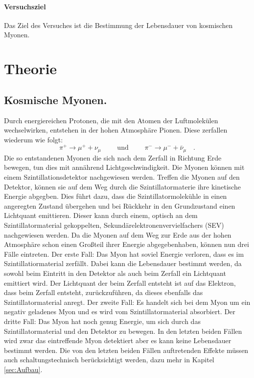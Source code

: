 \paragraph{Versuchsziel}
Das Ziel des Versuches ist die Bestimmung der Lebensdauer von kosmischen Myonen.

\section{Theorie}
\label{sec:Theorie}

\subsection{Kosmische Myonen.}
Durch energiereichen Protonen, die mit den Atomen der Luftmolekülen wechselwirken, entstehen in der hohen 
Atmosphäre Pionen. Diese zerfallen wiederum wie folgt:
\begin{equation*} 
\pi^+ \to \mu^+ + \nu_{\mu} \qquad \text{ und } \qquad \pi^- \to \mu^- + \bar{\nu}_{\mu} \quad .
\end{equation*}
Die so entstandenen Myonen die sich nach dem Zerfall in Richtung Erde bewegen, tun dies mit annährend 
Lichtgeschwindigkeit. Die Myonen können mit einem Szintillationsdetektor nachgewiesen werden. 
Treffen die Myonen auf den Detektor, können sie auf dem  Weg durch die Szintillatormaterie ihre kinetische 
Energie abgegben. Dies führt dazu, dass die Szintillatormolekühle in einen angeregten Zustand übergehen und bei 
Rückkehr in den Grundzustand einen Lichtquant emittieren. Dieser kann durch einem, optisch an dem 
Szintillatormaterial gekoppelten, Sekundärelektronenvervielfachers (SEV) nachgewiesen werden. Da die Myonen auf dem
Weg zur Erde aus der hohen Atmosphäre schon einen Großteil ihrer Energie abgegebenhaben, können nun drei Fälle 
eintreten. Der erste Fall: Das Myon hat soviel Energie verloren, dass es im Szintillatiormaterial zerfällt. Dabei 
kann die Lebensdauer bestimmt werden, da sowohl beim Eintritt in den Detektor als auch beim Zerfall ein Lichtquant 
emittiert wird. Der Lichtquant der beim Zerfall entsteht ist auf das Elektron, dass beim Zerfall entsteht, 
zurückzuführen, da dieses ebenfalls das Szintillatormaterial anregt. Der zweite Fall: Es handelt sich bei dem 
Myon um ein negativ geladenes Myon und es wird vom Szintillatormaterial absorbiert. Der dritte Fall: Das 
Myon hat noch genug Energie, um sich durch das 
Szintillatormaterial und den Detektor zu bewegen. In den letzten beiden Fällen wird zwar das eintreffende Myon 
detektiert aber es kann keine Lebensdauer bestimmt werden. Die von den letzten beiden Fällen auftretenden 
Effekte müssen auch schaltungstechnisch berücksichtigt werden, dazu mehr in Kapitel \ref{sec:Aufbau}.
